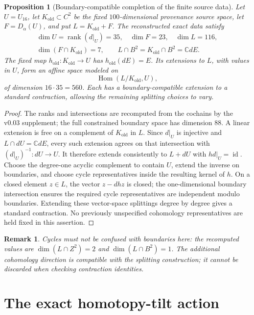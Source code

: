 \documentclass[11pt]{amsart}
\newtheorem{proposition}[theorem]{Proposition}
\newtheorem{remark}[theorem]{Remark}
\newcommand{\C}{\mathbb C}
\newcommand{\Hom}{\operatorname{Hom}}
\newcommand{\rank}{\operatorname{rank}}
\newcommand{\id}{\operatorname{id}}
\begin{document}
\begin{proposition}[Boundary-compatible completion of the finite source data]\label{prop:completion}
Let \(U=U_{16}\), let \(K_{\mathrm{old}}\subset C^2\) be the fixed
\(100\)-dimensional provenance source space, let \(F=D_\alpha(U)\), and put
\(L=K_{\mathrm{old}}+F\). The reconstructed exact data satisfy
\[
\begin{gathered}
\dim U=\rank(d|_U)=35,\quad \dim F=23,\quad \dim L=116,\\
\dim(F\cap K_{\mathrm{old}})=7,\qquad
L\cap B^2=K_{\mathrm{old}}\cap B^2=\C dE.
\end{gathered}
\]
The fixed map \(h_{\mathrm{old}}:K_{\mathrm{old}}\to U\) has \(h_{\mathrm{old}}(dE)=E\).
Its extensions to \(L\), with values in \(U\), form an affine space modeled on
\[
\Hom(L/K_{\mathrm{old}},U),
\]
of dimension \(16\cdot35=560\). Each has a boundary-compatible extension to a
standard contraction, allowing the remaining splitting choices to vary.
\end{proposition}
\begin{proof}
The ranks and intersections are recomputed from the cochains by the v0.03
supplement; the full constrained boundary space has dimension \(88\).
A linear extension is free on a complement of \(K_{\mathrm{old}}\) in \(L\).
Since \(d|_U\) is injective and \(L\cap dU=\C dE\), every such extension
agrees on that intersection with \((d|_U)^{-1}:dU\to U\).
It therefore extends consistently to \(L+dU\) with \(hd|_U=\id\).
Choose the degree-one acyclic complement to contain \(U\), extend the inverse
on boundaries, and choose cycle representatives inside the resulting kernel of
\(h\). On a closed element \(z\in L\), the vector \(z-dhz\) is closed; the
one-dimensional boundary intersection ensures the required cycle representatives
are independent modulo boundaries. Extending these vector-space splittings
degree by degree gives a standard contraction.
No previously unspecified cohomology representatives are held fixed in this assertion.
\end{proof}

\begin{remark}
Cycles must not be confused with boundaries here: the recomputed values are
\(\dim(L\cap Z^2)=2\) and \(\dim(L\cap B^2)=1\).
The additional cohomology direction is compatible with the splitting construction;
it cannot be discarded when checking contraction identities.
\end{remark}

\section{The exact homotopy-tilt action}
\end{document}
